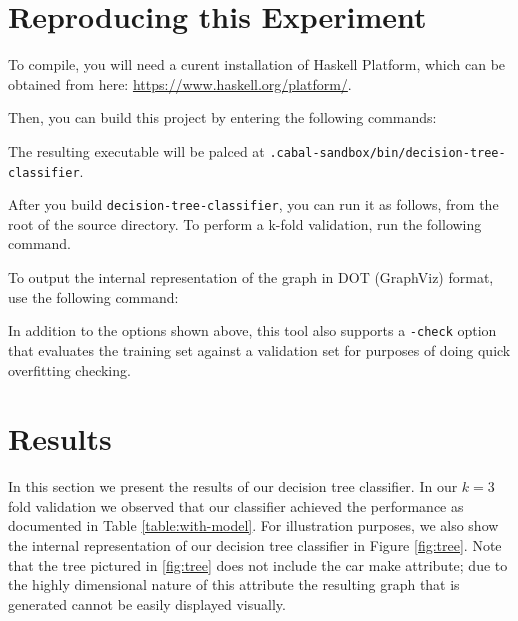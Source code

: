 \documentclass[letterpaper,12pt]{article}
\begin{document}
\section{Reproducing this Experiment}
\label{sec:reproduction}
To compile, you will need a curent installation of Haskell Platform,
which can be obtained from here: \href{https://www.haskell.org/platform/}{https://www.haskell.org/platform/}.

Then, you can build this project by entering the following commands:

The resulting executable will be palced at \texttt{.cabal-sandbox/bin/decision-tree-classifier}.

After you build \texttt{decision-tree-classifier}, you can run it as follows,
from the root of the source directory. To perform a k-fold validation,
run the following command. 


To output the internal representation of the graph in DOT (GraphViz)
format, use the following command:

In addition to the options shown above, this tool also supports a \texttt{-check} option that evaluates the training set against a validation set for purposes of doing quick overfitting checking. 


\section{Results}
 

In this section we present the results of our decision tree classifier. In our $k=3$ fold validation we observed that our classifier achieved the performance as documented in Table \ref{table:with-model}. For illustration purposes, we also show the internal representation of our decision tree classifier in Figure \ref{fig:tree}. Note that the tree pictured in \ref{fig:tree} does not include the car make attribute; due to the highly dimensional nature of this attribute the resulting graph that is generated cannot be easily displayed visually. 
\end{document}
